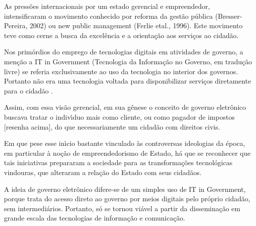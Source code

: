 \documentclass[
12pt,		%
openright,	%
twoside,  %
a4paper,			%
chapter=TITLE,		%
english,			%
french,				%
spanish,			%
brazil				%
]{USPSC-classe/USPSC}
\begin{document}
As press\~oes internacionais por um estado \textquotedbl gerencial e empreendedor, intensificaram o movimento conhecido por reforma da gest\~ao p\'ublica (Bresser-Pereira, 2002) ou new public management (Ferlie etal., 1996). Este movimento teve como cerne a \textquotedbl busca da excel\^encia e a orienta\c{c}\~ao aos servi\c{c}os ao cidad\~ao.














Nos prim\'ordios do emprego de tecnologias digitais em atividades de governo, a men\c{c}\~ao a \textquotedbl IT in Government (\textquotedbl Tecnologia da Informa\c{c}\~ao no Governo, em tradu\c{c}\~ao livre) se referia exclusivamente ao uso da tecnologia no interior dos governos. Portanto n\~ao era uma tecnologia voltada para disponibilizar servi\c{c}os diretamente para o cidad\~ao .














Assim, com essa vis\~ao gerencial, em sua g\^enese o conceito de governo eletr\^onico buscava tratar o indiv\'{\i}duo mais como \textquotedbl cliente, ou como \textquotedbl pagador de impostos [resenha acima], do que necessariamente um cidad\~ao com direitos civis.














Em que pese esse in\'{\i}cio bastante vinculado \`as controversas ideologias da \'epoca, em particular \`a no\c{c}\~ao de \textquotedbl empreendedorismo de Estado, h\'a que se reconhecer que tais iniciativas prepararam a sociedade para as transforma\c{c}\~oes tecnol\'ogicas vindouras, que alteraram a rela\c{c}\~ao do Estado com seus cidad\~aos.














A ideia de governo eletr\^onico difere-se de um simples uso de \textquotedbl IT in Government, porque trata do acesso direto ao governo por meios digitais pelo pr\'oprio cidad\~ao, sem intermedi\'arios. Portanto, s\'o se tornou vi\'avel a partir da dissemina\c{c}\~ao em grande escala das tecnologias de informa\c{c}\~ao e comunica\c{c}\~ao.
\end{document}
